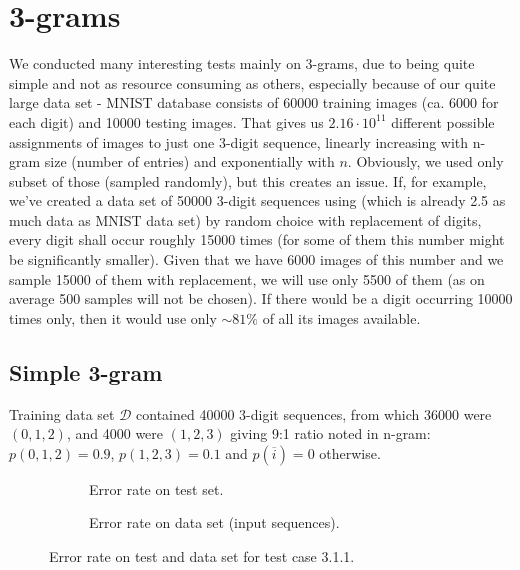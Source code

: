 \documentclass[shortabstract,lic,english]{iithesis}
\begin{document}
\section{3-grams}

We conducted many interesting tests mainly on 3-grams, due to being quite simple and not as resource consuming as others, especially because of our quite large data set - MNIST database consists of 60000 training images (ca. 6000 for each digit) and 10000 testing images. That gives us $2.16\cdot10^{11}$ different possible assignments of images to just one 3-digit sequence, linearly increasing with n-gram size (number of entries) and exponentially with $n$. Obviously, we used only subset of those (sampled randomly), but this creates an issue. If, for example, we've created a data set of 50000 3-digit sequences using (which is already 2.5 as much data as MNIST data set) by random choice with replacement of digits, every digit shall occur roughly 15000 times (for some of them this number might be significantly smaller). Given that we have 6000 images of this number and we sample 15000 of them with replacement, we will use only 5500 of them (as on average 500 samples will not be chosen). If there would be a digit occurring 10000 times only, then it would use only $\sim81\%$ of all its images available.

\subsection{Simple 3-gram}

Training data set $\mathcal{D}$ contained 40000 3-digit sequences, from which 36000 were $(0, 1, 2)$, and 4000 were $(1, 2, 3)$ giving 9:1 ratio noted in n-gram: $p(0,1,2)=0.9$, $p(1, 2, 3)=0.1$ and $p(\overline{i})=0$ otherwise.

\begin{figure}[h]
\begin{subfigure}[b]{.49\textwidth}
    \def\svgwidth{\textwidth}
    
    \caption{Error rate on test set.}
    \label{fig:t311_test_error}
\end{subfigure}
\begin{subfigure}[b]{.49\textwidth}
    \def\svgwidth{\textwidth}
    
    \caption{Error rate on data set (input sequences).}
    \label{fig:t311_data_error}
\end{subfigure}
\caption{Error rate on test and data set for test case 3.1.1.}
\end{figure}
\end{document}
